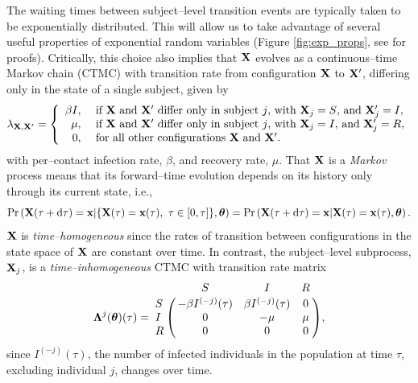 The waiting times between subject--level transition events are typically taken to be exponentially distributed. This will allow us to take advantage of several useful properties of exponential random variables (Figure \ref{fig:exp_props}, see \cite{wilkinson2011stochastic} for proofs). Critically, this choice also implies that $ \mathbf{X} $ evolves as a continuous--time Markov chain (CTMC) with transition rate from configuration $ \mathbf{X} $ to $ \mathbf{X}^\prime $, differing only in the state of a single subject, given by
\begin{equation}
\lambda_{\mathbf{X},\mathbf{X}^\prime} = \left \lbrace \begin{array}{rl}
\beta I,\ &\text{if } \mathbf{X}\ \text{and } \mathbf{X}^\prime\ \text{differ only in subject }j \text{, with }\mathbf{X}_j=S\text{, and }\mathbf{X}_j^\prime=I,\\
\mu,\ &\text{if } \mathbf{X}\ \text{and } \mathbf{X}^\prime\ \text{differ only in subject }j \text{, with }\mathbf{X}_j=I\text{, and }\mathbf{X}_j^\prime=R,\\
0,\ & \text{for all other configurations }\mathbf{X}\ \text{and }\mathbf{X}^\prime.
\end{array}\right.
\end{equation}
with per--contact infection rate,  $ \beta $, and recovery rate, $ \mu $. That $ \mathbf{X} $ is a \textit{Markov} process means that its forward--time evolution depends on its history only through its current state, i.e.,
\begin{equation}
\label{eqn:sir_markov}
\Pr\left (\bX(\tau + \dtau) = \bx | \lbrace\bX(\tau) = \bx(\tau),\ \tau\in[0,\tau]\rbrace, \btheta\right ) = \Pr\left (\bX(\tau + \dtau) = \bx | \bX(\tau) = \bx(\tau),\btheta\right ).
\end{equation}
$ \mathbf{X} $ is \textit{time--homogeneous} since the rates of transition between configurations in the state space of $ \mathbf{X} $ are constant over time. In contrast, the subject--level subprocess, $ \mathbf{X}_j $, is a \textit{time--inhomogeneous} CTMC with transition rate matrix
\begin{equation} 
\label{eqn:sir_subj_rate_mtx}
\bLambda^{j}(\btheta)(\tau) = \bordermatrix{ & S & I & R \cr
	S & -\beta I^{(-j)}(\tau) & \beta I^{(-j)}(\tau) & 0 \cr 
	I & 0 & -\mu & \mu \cr
	R & 0 & 0 & 0 },
\end{equation}
 since $ I^{(-j)}(\tau) $, the number of infected individuals in the population at time $ \tau $, excluding individual $ j $, changes over time. 

